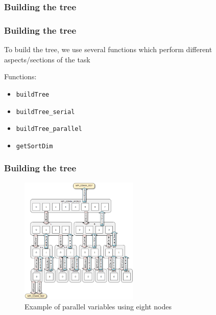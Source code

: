 \documentclass[usernames,dvipsnames]{beamer}
\begin{document}
\subsubsection{Building the tree}

\begin{frame}
	\frametitle{Building the tree}
	
	To build the tree, we use several functions which perform different aspects/sections of the task
	
	\vspace{10pt}
	
	\begin{block}{Functions:}
		\begin{itemize}
			\item \texttt{buildTree}
			\item \texttt{buildTree\_serial}
			\item \texttt{buildTree\_parallel}
			\item \texttt{getSortDim}
		\end{itemize}
	\end{block}
\end{frame}


\begin{frame}
	\frametitle{Building the tree}
	    \begin{figure}[h!]
       	    \centering
            \includegraphics[width=0.5\textwidth]{images/communicators.png}
            \caption{Example of parallel variables using eight nodes}
            \label{fig:communicators}
        \end{figure}
\end{frame}
\end{document}
